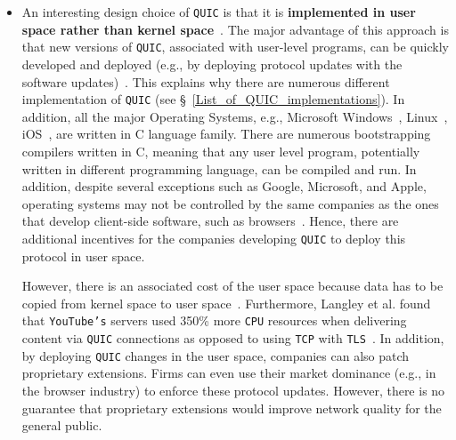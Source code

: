 \documentclass[12pt,a4paper,twoside,openright]{report}
\newcommand\note[2]{{\color{#1}\bf #2}}
\newcommand\simon[1]{\ifcomments{\note{cyan}{SM: #1}}\fi}
\begin{document}
\begin{itemize}
  

  \item 
  An interesting design choice of \texttt{QUIC} is that it is \textbf{implemented in user space rather than kernel space}~\cite{the-road-to-quic, Implementation_and_Performance_Evaluation_of_the_QUIC_Protocol_in_Linux_Kernel, quic-and-http-3-too-big-to-fail}.
  The major advantage of this approach is that new versions of \texttt{QUIC}, associated with user-level programs, can be quickly developed and deployed (e.g., by deploying protocol updates with the software updates)~\cite{the-road-to-quic}.
  This explains why there are numerous different implementation of \texttt{QUIC} (see \S~\ref{List_of_QUIC_implementations}).
  In addition, all the major Operating Systems, e.g., Microsoft Windows~\cite{OS_implementations}, Linux~\cite{OS_implementations, linux_kernel_programming_language}, iOS~\cite{OS_implementations, IOKitFundamentals}, are written in C language family.
  There are numerous bootstrapping compilers written in C, meaning that any user level program, potentially written in different programming language, can be compiled and run.
  In addition, despite several exceptions such as Google, Microsoft, and Apple, operating systems may not be controlled by the same companies as the ones that develop client-side software, such as browsers~\cite{2016-12-01-quic-tou}.
  Hence, there are additional incentives for the companies developing \texttt{QUIC} to deploy this protocol in user space.
  
  However, there is an associated cost of the user space because data has to be copied from kernel space to user space~\cite{benchmarking-quic}.
  Furthermore, Langley et al. found that \texttt{YouTube's} servers used 350\% more \texttt{CPU} resources when delivering content via \texttt{QUIC} connections as opposed to using \texttt{TCP} with \texttt{TLS}~\cite{The_QUIC_Transport_Protocol_Design_and_Internet-Scale_Deployment}.
  In addition, by deploying \texttt{QUIC} changes in the user space, companies can also patch proprietary extensions.
  Firms can even use their market dominance (e.g., in the browser industry) to enforce these protocol updates.
  However, there is no guarantee that proprietary extensions would improve network quality for the general public. 





\end{itemize}
\end{document}
